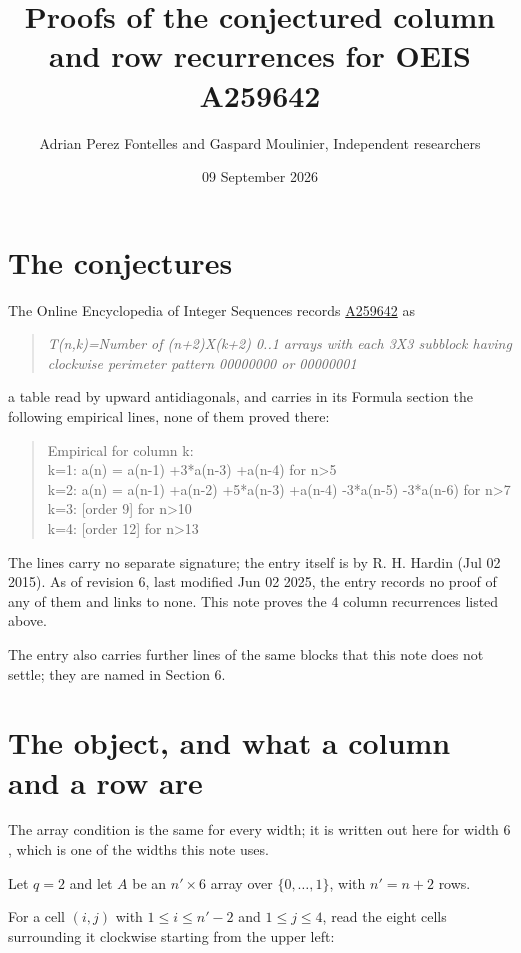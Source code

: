 \documentclass[11pt]{article}
\title{Proofs of the conjectured column and row recurrences for OEIS A259642}
\author{Adrian Perez Fontelles and Gaspard Moulinier, Independent researchers}
\date{09 September 2026}
\theoremstyle{definition}
\begin{document}
\maketitle
\section{The conjectures}

The Online Encyclopedia of Integer Sequences records \href{https://oeis.org/A259642}{A259642} as

\begin{quote}\itshape T(n,k)=Number of (n+2)X(k+2) 0..1 arrays with each 3X3 subblock having clockwise perimeter pattern 00000000 or 00000001\end{quote}

a table read by upward antidiagonals, and carries in its Formula section the following empirical lines, none of them proved there:

\begin{quote}\ttfamily Empirical for column k:\\
k=1: a(n) = a(n-1) +3*a(n-3) +a(n-4) for n>5\\k=2: a(n) = a(n-1) +a(n-2) +5*a(n-3) +a(n-4) -3*a(n-5) -3*a(n-6) for n>7\\k=3: [order 9] for n>10\\k=4: [order 12] for n>13\end{quote}

The lines carry no separate signature; the entry itself is by R. H. Hardin (Jul 02 2015). As of revision 6, last modified Jun 02 2025, the entry records no proof of any of them and links to none. This note proves the 4 column recurrences listed above.

The entry also carries further lines of the same blocks that this note does not settle; they are named in Section 6.

\section{The object, and what a column and a row are}

The array condition is the same for every width; it is written out here for width $6$, which is one of the widths this note uses.

Let $q = 2$ and let $A$ be an $n' \times 6$ array over $\{0,\dots,1\}$, with $n' = n + 2$ rows.

For a cell $(i,j)$ with $1 \le i \le n'-2$ and $1 \le j \le 4$, read the eight cells surrounding it clockwise starting from the upper left:
\end{document}
